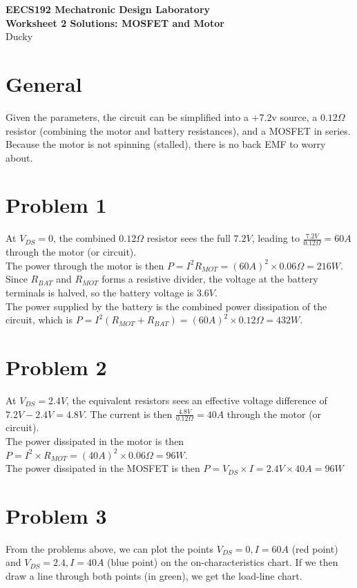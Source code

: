 \documentclass{article}
\begin{document}
{\centering \Large \bf EECS192 Mechatronic Design Laboratory \\}
{\centering \bf Worksheet 2 Solutions: MOSFET and Motor \\}
{\centering Ducky \\}
\section{General}
Given the parameters, the circuit can be simplified into a $+7.2$v source, a $0.12\Omega$ resistor (combining the motor and battery resistances), and a MOSFET in series. Because the motor is not spinning (stalled), there is no back EMF to worry about.

\section{Problem 1}
At $V_{DS}=0$, the combined $0.12\Omega$ resistor sees the full $7.2V$, leading to $\frac{7.2V}{0.12\Omega}=60A$ through the motor (or circuit). \\
The power through the motor is then $P=I^2R_{MOT}=(60A)^2 \times 0.06\Omega=216W$. \\
Since $R_{BAT}$ and $R_{MOT}$ forms a resistive divider, the voltage at the battery terminals is halved, so the battery voltage is $3.6V$. \\
The power supplied by the battery is the combined power dissipation of the circuit, which is $P=I^2(R_{MOT}+R_{BAT})=(60A)^2 \times 0.12\Omega=432W$.

\section{Problem 2}
At $V_{DS}=2.4V$, the equivalent resistors sees an effective voltage difference of $7.2V-2.4V=4.8V$. The current is then $\frac{4.8V}{0.12\Omega}=40A$ through the motor (or circuit). \\
The power dissipated in the motor is then $P=I^2 \times R_{MOT}=(40A)^2 \times 0.06\Omega=96W$. \\
The power dissipated in the MOSFET is then $P=V_{DS} \times I=2.4V \times 40A=96W$

\section{Problem 3}
From the problems above, we can plot the points $V_{DS}=0, I=60A$ (red point) and $V_{DS}=2.4, I=40A$ (blue point) on the on-characteristics chart. If we then draw a line through both points (in green), we get the load-line chart.
\end{document}
